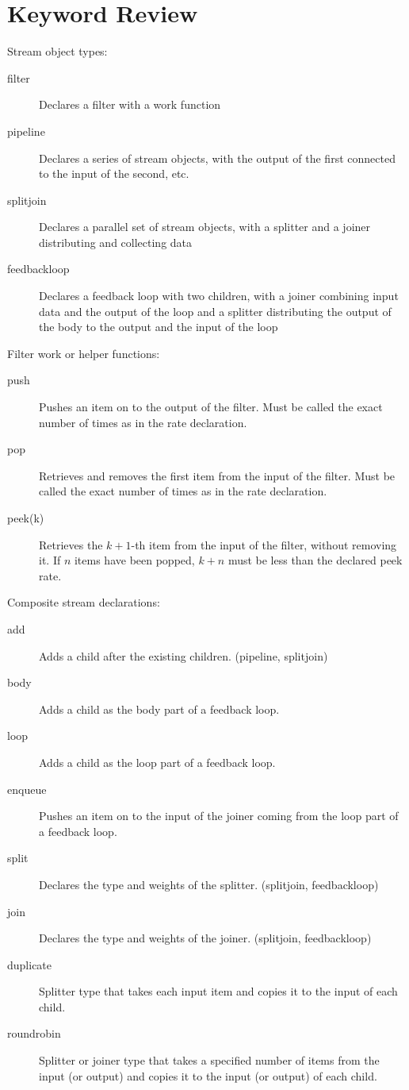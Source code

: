 \bigskip \section{Keyword Review}

\noindent Stream object types:

\begin{description}
\item[filter] Declares a filter with a work function
\item[pipeline] Declares a series of stream objects, with the output
  of the first connected to the input of the second, etc.
\item[splitjoin] Declares a parallel set of stream objects, with a
  splitter and a joiner distributing and collecting data
\item[feedbackloop] Declares a feedback loop with two children, with a
  joiner combining input data and the output of the loop and a
  splitter distributing the output of the body to the output and the
  input of the loop
\end{description}

\noindent Filter work or helper functions:

\begin{description}
\item[push] Pushes an item on to the output of the filter.  Must be
  called the exact number of times as in the rate declaration.
\item[pop] Retrieves and removes the first item from the input of the
  filter.  Must be called the exact number of times as in the rate
  declaration.
\item[peek(k)] Retrieves the $k+1$-th item from the input of the
  filter, without removing it.  If $n$ items have been popped, $k+n$
  must be less than the declared peek rate.
\end{description}

\noindent Composite stream declarations:

\begin{description}
\item[add] Adds a child after the existing children.  (pipeline,
  splitjoin)
\item[body] Adds a child as the body part of a feedback loop.
\item[loop] Adds a child as the loop part of a feedback loop.
\item[enqueue] Pushes an item on to the input of the joiner coming
  from the loop part of a feedback loop.
\item[split] Declares the type and weights of the splitter.
  (splitjoin, feedbackloop)
\item[join] Declares the type and weights of the joiner.  (splitjoin,
  feedbackloop)
\item[duplicate] Splitter type that takes each input item and copies
  it to the input of each child.
\item[roundrobin] Splitter or joiner type that takes a specified
  number of items from the input (or output) and copies it to the
  input (or output) of each child.
\end{description}